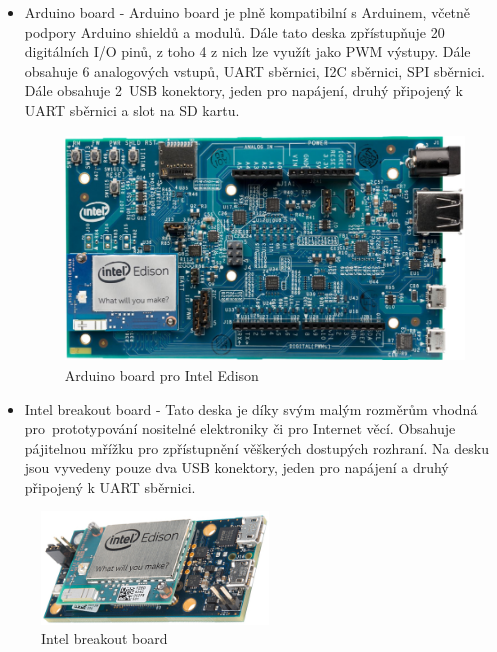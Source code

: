 			\begin{itemize}
				\item Arduino board - Arduino board je plně kompatibilní s Arduinem, včetně podpory Arduino shieldů a modulů. Dále tato deska zpřístupňuje 20 digitálních I/O pinů, z toho 4 z nich lze využít jako PWM výstupy. Dále obsahuje 6 analogových vstupů, UART sběrnici, I2C sběrnici, SPI sběrnici. Dále obsahuje 2~USB konektory, jeden pro napájení, druhý připojený k UART sběrnici a slot na SD kartu.
				
				\begin{figure}[!ht]
  \begin{center}
    \includegraphics[height=6cm]{obrazky/embed_intel_edison2}
  \end{center}
	\vspace{-20pt}
  \caption{Arduino board pro Intel Edison}
	\label{embed_intel_edison2}
	\vspace{-10pt}
\end{figure}
				
				\item Intel breakout board -  Tato deska je díky svým malým rozměrům vhodná pro~prototypování nositelné elektroniky či pro Internet věcí. Obsahuje pájitelnou mřížku pro zpřístupnění věškerých dostupých rozhraní. Na desku jsou vyvedeny pouze dva USB konektory, jeden pro napájení a druhý připojený k UART sběrnici.
\end{itemize}

\begin{figure}[!ht]
  \begin{center}
    \includegraphics[height=3cm]{obrazky/embed_intel_edison1}
  \end{center}
	\vspace{-20pt}
  \caption{Intel breakout board}
	\label{embed_intel_edison1}
	\vspace{-10pt}
\end{figure}


